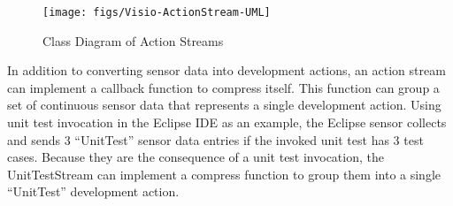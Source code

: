 \begin{figure}[htbp]
  \centering
  \texttt{[image: figs/Visio-ActionStream-UML]}
  \caption{Class Diagram of Action Streams}
  \label{fig:SDSA-ActionStream-UML}
\end{figure}

In addition to converting sensor data into development actions, 
an action stream can implement a callback function to compress 
itself. This function can group a set of continuous sensor data 
that represents a single development action. Using unit test 
invocation in the Eclipse IDE as an example, the Eclipse sensor 
collects and sends 3 ``UnitTest'' sensor data entries if the 
invoked unit test has 3 test cases. Because they are the 
consequence of a unit test invocation, the UnitTestStream 
can implement a compress function to group them into a single 
``UnitTest'' development action. 

